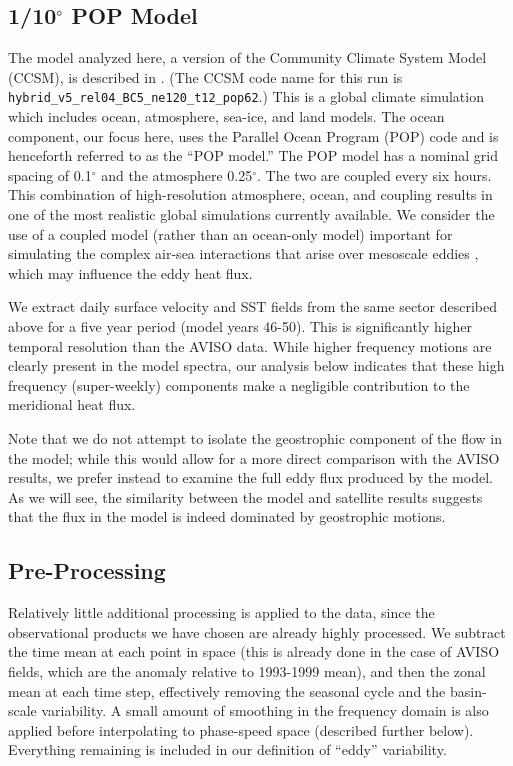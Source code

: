 \documentclass[10pt]{article}
\begin{document}
\subsection{1/10$^\circ$ POP Model}

The model analyzed here, a version of the Community Climate System Model (CCSM), is described in \citet{MccleanEtAl2011}.  (The CCSM code name for this run is {\tt 	hybrid\_v5\_rel04\_BC5\_ne120\_t12\_pop62}.) This is a global climate simulation which includes ocean, atmosphere, sea-ice, and land models. The ocean component, our focus here, uses the Parallel Ocean Program (POP) code and is henceforth referred to as the ``POP model.'' The POP model has a nominal grid spacing of 0.1$^\circ$ and the atmosphere 0.25$^\circ$. The two are coupled every six hours. This combination of high-resolution atmosphere, ocean, and coupling results in one of the most realistic global simulations currently available. We consider the use of a coupled model (rather than an ocean-only model) important for simulating the complex air-sea interactions that arise over mesoscale eddies \citep{SmallEtAl2008,BryanEtAl2010}, which may influence the eddy heat flux.

We extract daily surface velocity and SST fields from the same sector described above for a five year period (model years 46-50). This is significantly higher temporal resolution than the AVISO data. While higher frequency motions are clearly present in the model spectra, our analysis below indicates that these high frequency (super-weekly) components make a negligible contribution to the meridional heat flux.

Note that we do not attempt to isolate the geostrophic component of the flow in the model; while this would allow for a more direct comparison with the AVISO results, we prefer instead to examine the full eddy flux produced by the model. As we will see, the similarity between the model and satellite results suggests that the flux in the model is indeed dominated by geostrophic motions.

\subsection{Pre-Processing}

Relatively little additional processing is applied to the data, since the observational products we have chosen are already highly processed. We subtract the time mean at each point in space (this is already done in the case of AVISO fields, which are the anomaly relative to 1993-1999 mean), and then the zonal mean at each time step, effectively removing the seasonal cycle and the basin-scale variability. A small amount of smoothing in the frequency domain is also applied before interpolating to phase-speed space (described further below). Everything remaining is included in our definition of ``eddy'' variability.
\end{document}
